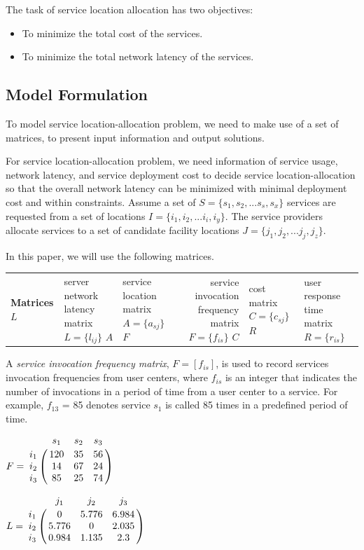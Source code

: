 \documentclass{llncs}
\let\bbordermatrix\bordermatrix
\begin{document}
The task of service location allocation has two objectives:
\begin{itemize}
	\item To minimize the total cost of the services.
	\item To minimize the total network latency of the services.
\end{itemize}


\subsection{Model Formulation}
\label{sec:model}
To model service location-allocation problem, we need to make use of a set of matrices, to present input information and output solutions. 

For service location-allocation problem, we need information of service usage, network latency, and service deployment cost to decide service location-allocation so that the overall network latency can be minimized with minimal deployment cost and within constraints.
Assume a set of $S = \{ s_{1}, s_{2}, ...s_{s}, s_{x}\}$ services are
requested from a set of locations $I = \{ i_{1}, i_{2}, ...i_{i}, i_{y} \}$. 
The service providers allocate services to a set of candidate facility locations $J = \{ j_{1}, j_{2}, ...j_{j}, j_{z} \}$.


In this paper, we will use the following matrices.
\begin{center}
{
	\begin{tabular}{l*{2}{l}r}
		\hline
		\textbf{Matrices} \cr
		$L$ & server network latency matrix $L = \{l_{ij}\}$ \cr
		$A$ & service location matrix $A = \{a_{sj}\}$ \cr
		$F$ & service invocation frequency matrix $F = \{f_{is}\}$ \cr
		$C$ & cost matrix $C = \{c_{sj}\}$ \cr
		$R$ & user response time matrix $R = \{r_{is}\}$ \cr
		\hline
	\end{tabular}
}
\end{center}
A \emph{service invocation frequency matrix}, $F= [f_{is}]$, is used to record services invocation frequencies from user centers, 
where $f_{is}$ is an integer that indicates the number of invocations in a period of time from a user center to a service. 
For example, $f_{13}$ = 85 denotes service $s_{1}$ is called 85 times in a predefined period of time.

\parbox{.45\linewidth}{
{\centering
$
F = \bbordermatrix{~ & s_{1} & s_{2} & s_{3}  \cr
					i_{1}	&120 &35 &56	\cr
					i_{2}	&14  &67 &24 \cr
					i_{3}	&85 &25 &74 \cr}
$
\\}
}
\parbox{.45\linewidth}{
{\centering
$
L = \bbordermatrix{~ & j_{1} & j_{2} & j_{3} \cr
					i_{1}	&0 &5.776 &6.984	\cr
					i_{2}	&5.776  &0 &2.035 \cr
					i_{3}	&0.984 &1.135	&2.3 \cr}
$
\\}
}
\end{document}
